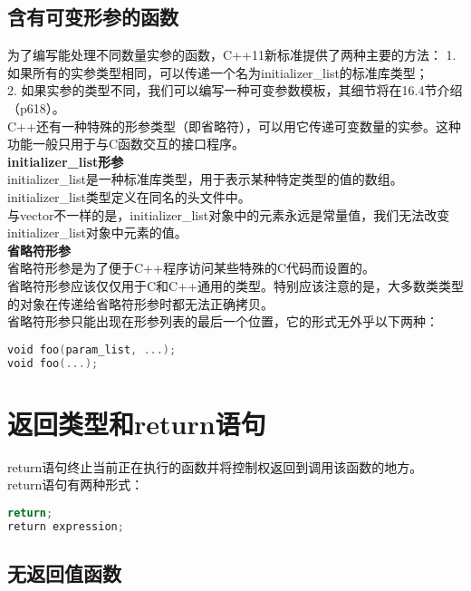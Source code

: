 \documentclass[
  a4paper,
  oneside,tablecaptionabove
]{scrbook}
\begin{document}
\subsection{含有可变形参的函数}\label{ux542bux6709ux53efux53d8ux5f62ux53c2ux7684ux51fdux6570}

为了编写能处理不同数量实参的函数，C++11新标准提供了两种主要的方法： 1.
如果所有的实参类型相同，可以传递一个名为initializer\_list的标准库类型；\\
2.
如果实参的类型不同，我们可以编写一种可变参数模板，其细节将在16.4节介绍（p618）。\\
C++还有一种特殊的形参类型（即省略符），可以用它传递可变数量的实参。这种功能一般只用于与C函数交互的接口程序。\\
\textbf{initializer\_list形参}\\
initializer\_list是一种标准库类型，用于表示某种特定类型的值的数组。initializer\_list类型定义在同名的头文件中。\\
与vector不一样的是，initializer\_list对象中的元素永远是常量值，我们无法改变initializer\_list对象中元素的值。\\
\textbf{省略符形参}\\
省略符形参是为了便于C++程序访问某些特殊的C代码而设置的。\\
省略符形参应该仅仅用于C和C++通用的类型。特别应该注意的是，大多数类类型的对象在传递给省略符形参时都无法正确拷贝。\\
省略符形参只能出现在形参列表的最后一个位置，它的形式无外乎以下两种：

\begin{lstlisting}[language={C++}]
void foo(param_list, ...);
void foo(...);
\end{lstlisting}

\section{返回类型和return语句}\label{ux8fd4ux56deux7c7bux578bux548creturnux8bedux53e5}

return语句终止当前正在执行的函数并将控制权返回到调用该函数的地方。\\
return语句有两种形式：

\begin{lstlisting}[language={C++}]
return;
return expression;
\end{lstlisting}

\subsection{无返回值函数}\label{ux65e0ux8fd4ux56deux503cux51fdux6570}
\end{document}
